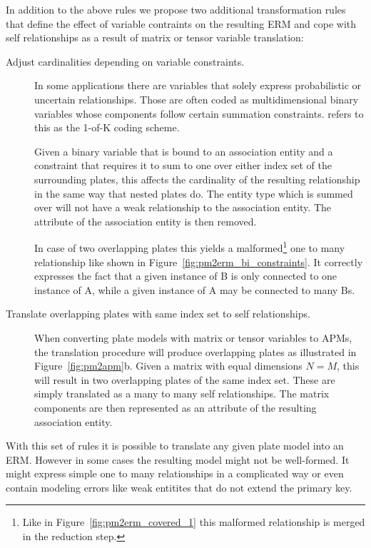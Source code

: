 In addition to the above rules we propose two additional transformation rules that define the effect of variable contraints on the resulting ERM and cope with self relationships as a result of matrix or tensor variable translation:

\begin{description}
\item[Adjust cardinalities depending on variable constraints.] In some applications there are variables that solely express probabilistic or uncertain relationships. Those are often coded as multidimensional binary variables whose components follow certain summation constraints. \textcite{bishop2006pattern} refers to this as the 1-of-K coding scheme.

Given a binary variable that is bound to an association entity and a constraint that requires it to sum to one over either index set of the surrounding plates, this affects the cardinality of the resulting relationship in the same way that nested plates do. The entity type which is summed over will not have a weak relationship to the association entity. The attribute of the association entity is then removed.

In case of two overlapping plates this yields a malformed\footnote{Like in Figure~\ref{fig:pm2erm_covered_1} this malformed relationship is merged in the reduction step.} one to many relationship like shown in Figure~\ref{fig:pm2erm_bi_constraints}. It correctly expresses the fact that a given instance of B is only connected to one instance of A, while a given instance of A may be connected to many Bs.

\item[Translate overlapping plates with same index set to self relationships.] When converting plate models with matrix or tensor variables to APMs, the translation procedure will produce overlapping plates as illustrated in Figure~\ref{fig:pm2apm}b. Given a matrix with equal dimensions $N = M$, this will result in two overlapping plates of the same index set. These are simply translated as a many to many self relationships. The matrix components are then represented as an attribute of the resulting association entity.
\end{description}

With this set of rules it is possible to translate any given plate model into an ERM. However in some cases the resulting model might not be well-formed. It might express simple one to many relationships in a complicated way or even contain modeling errors like weak entitites that do not extend the primary key.

